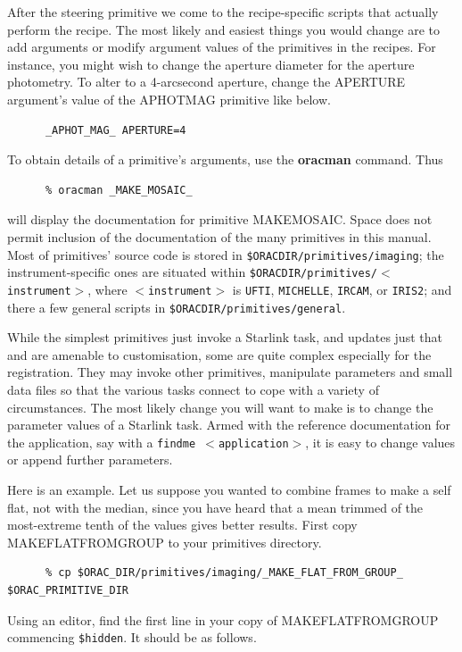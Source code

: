 \documentclass[twoside,11pt]{article}
\renewcommand{\_}{\texttt{\symbol{95}}}
\begin{document}
After the steering primitive we come to the recipe-specific scripts
that actually perform the recipe.  The most likely and easiest things
you would change are to add arguments or modify argument values of the
primitives in the recipes.  For instance, you might wish to change the
aperture diameter for the aperture photometry.  To alter to a
4-arcsecond aperture, change the APERTURE argument's value of the
\_APHOT\_MAG\_ primitive like below.

\begin{verbatim}
      _APHOT_MAG_ APERTURE=4
\end{verbatim}

To obtain details of a primitive's arguments, use the {\bf oracman}
command.  Thus

\begin{verbatim}
      % oracman _MAKE_MOSAIC_
\end{verbatim}
will display the documentation for primitive \_MAKE\_MOSAIC\_.  Space
does not permit inclusion of the documentation of the many primitives
in this manual.  Most of primitives' source code is stored in
{\tt \$ORAC\_DIR/primitives/imaging}; the instrument-specific ones
are situated within {\tt \$ORAC\_DIR/primitives/$<$instrument$>$}, where
{\tt$<$instrument$>$} is {\tt UFTI}, {\tt MICHELLE}, {\tt IRCAM}, or 
{\tt IRIS2}; and there a few general scripts in {\tt \$ORAC\_DIR/primitives/general}.

While the simplest primitives just invoke a Starlink task, and updates
just that and are amenable to customisation, some are quite complex
especially for the registration.  They may invoke other primitives,
manipulate parameters and small data files so that the various tasks
connect to cope with a variety of circumstances.  The most likely
change you will want to make is to change the parameter values of a
Starlink task.  Armed with the reference documentation for the
application, say with a {\tt findme $<$application$>$}, it is easy
to change values or append further parameters.  

Here is an example.  Let us suppose you wanted to combine frames to
make a self flat, not with the median, since you have heard that a mean
trimmed of the most-extreme tenth of the values gives better results.
First copy \_MAKE\_FLAT\_FROM\_GROUP\_ to your primitives directory.

\begin{verbatim}
      % cp $ORAC_DIR/primitives/imaging/_MAKE_FLAT_FROM_GROUP_ $ORAC_PRIMITIVE_DIR
\end{verbatim}
Using an editor, find the first line in your copy of
\_MAKE\_FLAT\_FROM\_GROUP\_ commencing {\tt \$hidden}.  It should be
as follows.
\end{document}

